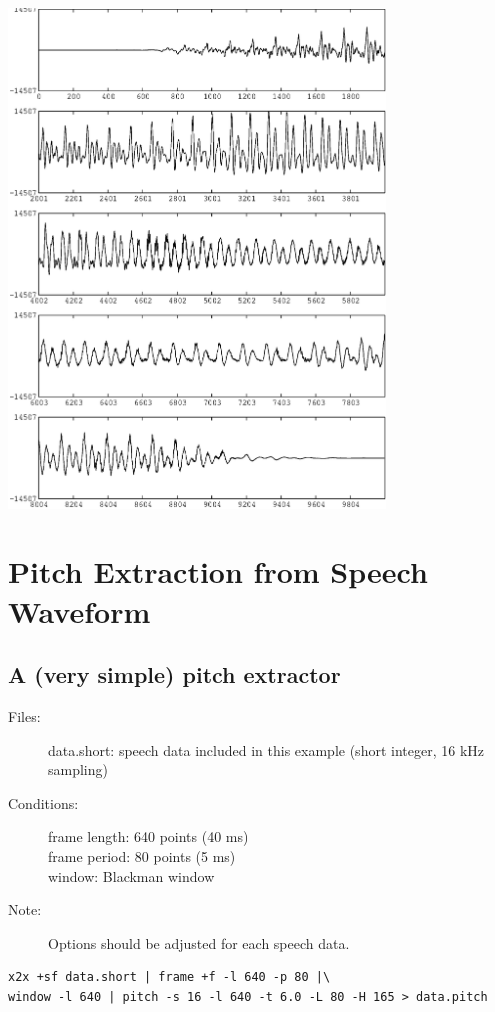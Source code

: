 \documentclass[a4paper,10pt]{article}
\begin{document}
\includegraphics[width=10cm]{eps/data.bcut.gwave.eps}

\section{Pitch Extraction from Speech Waveform}

\subsection{A (very simple) pitch extractor}

\begin{description}
\item[Files:]
  data.short: speech data included in this example (short integer, 16 kHz sampling)\\
\item[Conditions:]
  frame length: 640 points (40 ms)\\
  frame period: 80 points (5 ms)\\
  window: Blackman window
\item[Note:]
  Options should be adjusted for each speech data.
\end{description}

\begin{verbatim}
x2x +sf data.short | frame +f -l 640 -p 80 |\
window -l 640 | pitch -s 16 -l 640 -t 6.0 -L 80 -H 165 > data.pitch
\end{verbatim}
\end{document}
